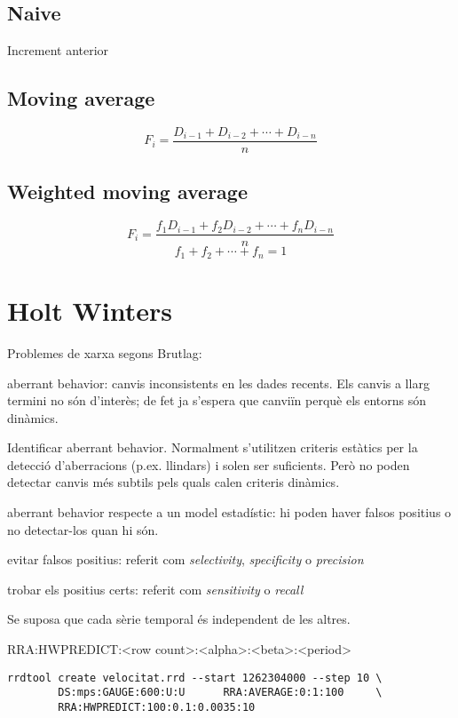 \subsection{Naive}

Increment anterior

\subsection{Moving average}

$$
F_i = \frac{D_{i-1} + D_{i-2} + \cdots + D_{i-n}}{n}
$$




\subsection{Weighted moving average}

$$
F_i = \frac{f_1D_{i-1} + f_2D_{i-2} + \cdots + f_nD_{i-n}}{n}
$$
$$
f_1+f_2+\cdots+f_n = 1
$$





\section{Holt Winters}
Problemes de xarxa segons Brutlag:

aberrant behavior: canvis inconsistents en les dades recents. Els canvis a llarg termini no són d'interès; de fet ja s'espera que canviïn perquè els entorns són dinàmics.

Identificar aberrant behavior. Normalment s'utilitzen criteris estàtics per la detecció d'aberracions (p.ex. llindars) i solen ser suficients. Però no poden detectar canvis més subtils pels quals calen criteris dinàmics. 

aberrant behavior respecte a un model estadístic: hi poden haver falsos positius o no detectar-los quan hi són.

evitar falsos positius: referit com \emph{selectivity}, \emph{specificity} o \emph{precision}

trobar els positius certs: referit com \emph{sensitivity} o \emph{recall}

Se suposa que cada sèrie temporal és independent de les altres.


RRA:HWPREDICT:<row count>:<alpha>:<beta>:<period>

\begin{lstlisting}
rrdtool create velocitat.rrd --start 1262304000 --step 10 \
        DS:mps:GAUGE:600:U:U      RRA:AVERAGE:0:1:100     \
        RRA:HWPREDICT:100:0.1:0.0035:10
\end{lstlisting}



